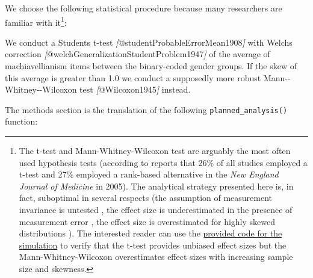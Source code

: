 \documentclass[psych,tutorial,submit,moreauthors,pdftex]{mdpi}
\newenvironment{Shaded}{\begin{snugshade}}{\end{snugshade}}
\newcommand{\CommentTok}[1]{\textcolor[rgb]{0.56,0.35,0.01}{\textit{#1}}}
\newcommand{\NormalTok}[1]{#1}
\newcommand{\OtherTok}[1]{\textcolor[rgb]{0.56,0.35,0.01}{#1}}
\begin{document}
We choose the following statistical procedure because many researchers
are familiar with it\footnote{The t-test and Mann-Whitney-Wilcoxon test
  are arguably the most often used hypothesis tests (according to
  \citep{fagerlandTtestsNonparametricTests2012, hortonStatisticalMethodsJournal2005}
  reports that 26\% of all studies employed a t-test and 27\% employed a
  rank-based alternative in the \emph{New England Journal of Medicine}
  in 2005). The analytical strategy presented here is, in fact,
  suboptimal in several respects (the assumption of measurement
  invariance is untested
  \citep{putnickMeasurementInvarianceConventions2016}, the effect size
  is underestimated in the presence of measurement error
  \citep{frostCorrectingRegressionDilution2000}, the effect size is
  overestimated for highly skewed distributions
  \citep{stonehouseRobustnessTestsCombined1998}). The interested reader
  can use the
  \href{https://github.com/aaronpeikert/repro-tutorial/blob/main/R/simulation.R}{provided
  code for the simulation} to verify that the t-test provides unbiased
  effect sizes but the Mann-Whitney-Wilcoxon overestimates effect sizes
  with increasing sample size and skewness.}:

\begin{Shaded}
\begin{Highlighting}[]
\NormalTok{We conduct a Student\textquotesingle{}s t{-}test }\CommentTok{[}\OtherTok{@studentProbableErrorMean1908}\CommentTok{]}\NormalTok{ with Welch\textquotesingle{}s}
\NormalTok{correction }\CommentTok{[}\OtherTok{@welchGeneralizationStudentProblem1947}\CommentTok{]}\NormalTok{ of the average of}
\NormalTok{machiavellianism items between the binary{-}coded gender groups. If the skew of}
\NormalTok{this average is greater than 1.0 we conduct a supposedly more robust Mann{-}{-}}
\NormalTok{Whitney{-}{-}Wilcoxon test }\CommentTok{[}\OtherTok{@Wilcoxon1945}\CommentTok{]}\NormalTok{ instead.}
\end{Highlighting}
\end{Shaded}

The methods section is the translation of the following
\texttt{planned\_analysis()} function:
\end{document}
